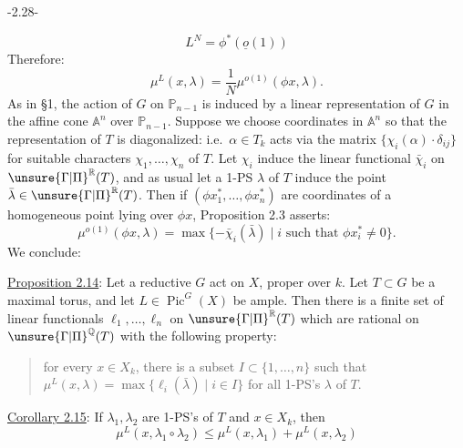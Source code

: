 \begin{center}-2.28-\end{center}
\[
L^N=\phi^*(\underline{o}(1))
\]
Therefore:
\[
\mu^L(x,\lambda)=\frac1N\mu^{o(1)}(\phi x,\lambda).
\]
As in \S1, the action of $G$ on $\mathbb P_{n-1}$ is induced by a linear representation of $G$ in the affine cone $\mathbb A^n$ over $\mathbb P_{n-1}$. Suppose we choose coordinates in $\mathbb A^n$ so that the representation of $T$ is diagonalized: i.e.\ $\alpha\in T_k$ acts via the matrix $\{\chi_i(\alpha)\cdot\delta_{ij}\}$ for suitable characters $\chi_1,\ldots,\chi_n$ of $T$. Let $\chi_i$ induce the linear functional $\bar\chi_i$ on $\unsure{\Gamma|\Pi}^{\mathbb R}(T)$, and as usual let a 1-PS $\lambda$ of $T$ induce the point $\bar\lambda\in\unsure{\Gamma|\Pi}^{\mathbb R}(T)$. Then if $(\phi x_1^*,\ldots,\phi x_n^*)$ are coordinates of a homogeneous point lying over $\phi x$, Proposition 2.3 asserts:
\[
\mu^{o(1)}(\phi x,\lambda)=\max\{-\bar\chi_i(\bar\lambda)\mid i\text{ such that }\phi x_i^*\neq0\}.
\]
We conclude:

\uline{Proposition 2.14}: Let a reductive $G$ act on $X$, proper over $k$. Let $T\subset G$ be a maximal torus, and let $L\in\operatorname{Pic}^G(X)$ be ample. Then there is a finite set of linear functionals $\ell_1,\ldots,\ell_n$ on $\unsure{\Gamma|\Pi}^{\mathbb R}(T)$ which are rational on $\unsure{\Gamma|\Pi}^{\mathbb Q}(T)$ with the following property:

\begin{quote}
for every $x\in X_k$, there is a subset $I\subset\{1,\ldots,n\}$ such that $\mu^L(x,\lambda)=\max\{\ell_i(\bar\lambda)\mid i\in I\}$ for all 1-PS's $\lambda$ of $T$.
\end{quote}

\uline{Corollary 2.15}: If $\lambda_1,\lambda_2$ are 1-PS's of $T$ and $x\in X_k$, then
\[
\mu^L(x,\lambda_1\circ\lambda_2)\leq\mu^L(x,\lambda_1)+\mu^L(x,\lambda_2)
\]
